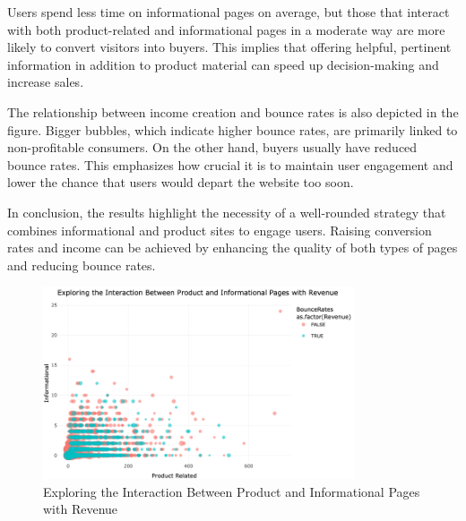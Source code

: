 \documentclass[12pt]{article}
\begin{document}
Users spend less time on informational pages on average, but those that interact with both product-related and informational pages in a moderate way are more likely to convert visitors into buyers. This implies that offering helpful, pertinent information in addition to product material can speed up decision-making and increase sales.


The relationship between income creation and bounce rates is also depicted in the figure. Bigger bubbles, which indicate higher bounce rates, are primarily linked to non-profitable consumers. On the other hand, buyers usually have reduced bounce rates. This emphasizes how crucial it is to maintain user engagement and lower the chance that users would depart the website too soon.


In conclusion, the results highlight the necessity of a well-rounded strategy that combines informational and product sites to engage users. Raising conversion rates and income can be achieved by enhancing the quality of both types of pages and reducing bounce rates.
\begin{figure}[h]
    \centering
    \includegraphics[width=0.82\textwidth]{Exploring the Interaction Between Product and Informational Pages with Revenue.png}  
    \caption{Exploring the Interaction Between Product and Informational Pages with Revenue}
\end{figure}
\vspace{0.5cm}
\newpage
\end{document}
